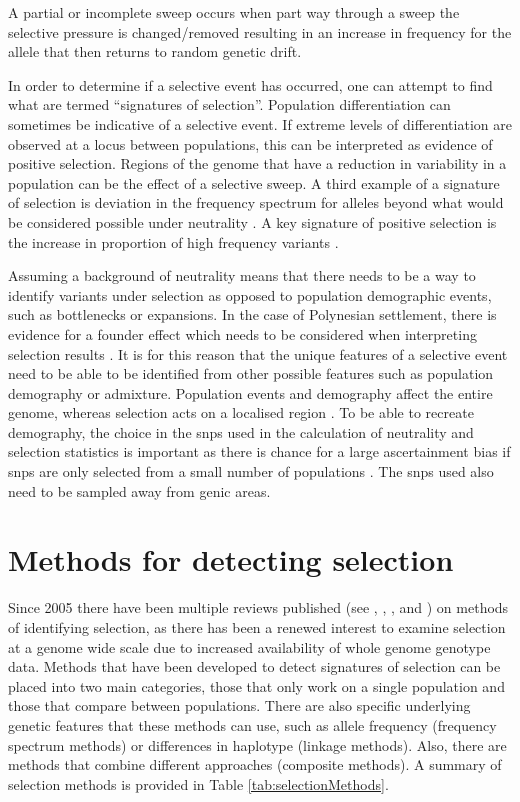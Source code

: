 \documentclass[]{report}
\begin{document}
A partial or incomplete sweep occurs when part way through a sweep the
selective pressure is changed/removed resulting in an increase in
frequency for the allele that then returns to random genetic drift.

In order to determine if a selective event has occurred, one can attempt
to find what are termed ``signatures of selection''. Population
differentiation can sometimes be indicative of a selective event. If
extreme levels of differentiation are observed at a locus between
populations, this can be interpreted as evidence of positive selection.
Regions of the genome that have a reduction in variability in a
population can be the effect of a selective sweep. A third example of a
signature of selection is deviation in the frequency spectrum for
alleles beyond what would be considered possible under neutrality
\citep{Przeworski2002}. A key signature of positive selection is the
increase in proportion of high frequency variants
\citep{fay2000hitchhiking}.

Assuming a background of neutrality means that there needs to be a way
to identify variants under selection as opposed to population
demographic events, such as bottlenecks or expansions. In the case of
Polynesian settlement, there is evidence for a founder effect which
needs to be considered when interpreting selection results
\citep{Kayser2006a}. It is for this reason that the unique features of a
selective event need to be able to be identified from other possible
features such as population demography or admixture. Population events
and demography affect the entire genome, whereas selection acts on a
localised region \citep{Stajich2005}. To be able to recreate demography,
the choice in the \glspl{snp} used in the calculation of neutrality and
selection statistics is important as there is chance for a large
ascertainment bias if \glspl{snp} are only selected from a small number
of populations \citep{Wall2008}. The \glspl{snp} used also need to be
sampled away from genic areas.

\section{Methods for detecting selection}\label{selMethods}

Since 2005 there have been multiple reviews published (see
\citet{Nielsen2005}, \citet{sabeti2006positive}, \citet{Utsunomiya2015},
\citet{Vitti2013} and \citet{Haasl2016}) on methods of identifying
selection, as there has been a renewed interest to examine selection at
a genome wide scale due to increased availability of whole genome
genotype data. Methods that have been developed to detect signatures of
selection can be placed into two main categories, those that only work
on a single population and those that compare between populations. There
are also specific underlying genetic features that these methods can
use, such as allele frequency (frequency spectrum methods) or
differences in haplotype (linkage methods). Also, there are methods that
combine different approaches (composite methods). A summary of selection
methods is provided in Table \ref{tab:selectionMethods}.
\end{document}
